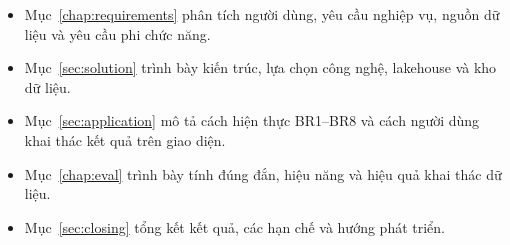 \begin{itemize}
  \item Mục~\ref{chap:requirements} phân tích người dùng, yêu cầu nghiệp vụ, nguồn dữ liệu và yêu cầu phi chức năng.
  \item Mục~\ref{sec:solution} trình bày kiến trúc, lựa chọn công nghệ, lakehouse và kho dữ liệu.
  \item Mục~\ref{sec:application} mô tả cách hiện thực BR1--BR8 và cách người dùng khai thác kết quả trên giao diện.
  \item Mục~\ref{chap:eval} trình bày tính đúng đắn, hiệu năng và hiệu quả khai thác dữ liệu.
  \item Mục~\ref{sec:closing} tổng kết kết quả, các hạn chế và hướng phát triển.
\end{itemize}
